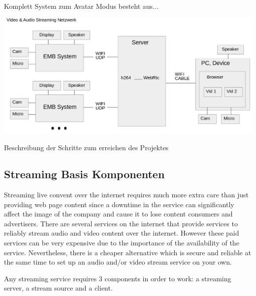  
Komplett System zum Avatar Modus besteht aus...\\

\begin{minipage}{\textwidth}
    \begin{center}
        
        \includegraphics[scale=0.4]{img/schemaproj.png} 
    \end{center}
\end{minipage}

Beschreibung der Schritte zum erreichen des Projektes


\subsection{Streaming Basis Komponenten}
Streaming live convent over the internet requires much more extra care than just providing web page content since a downtime in the service can significantly affect the image of the company and cause it to lose content consumers and advertisers. There are several services on the internet that provide services to reliably stream audio and video content over the internet. However these paid services can be very expensive due to the importance of the availability of the service. Nevertheless, there is a cheaper alternative which is secure and reliable at the same time to set up an audio and/or video stream service on your own.

Any streaming service requires 3 components in order to work: a streaming server, a stream source and a client.

